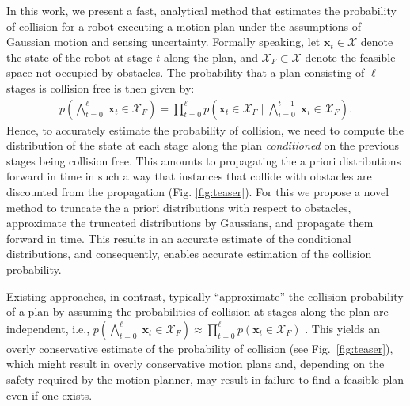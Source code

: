 In this work, we present a fast, analytical method that estimates the probability of collision for a robot executing a motion plan under the assumptions of Gaussian motion and sensing uncertainty. %
Formally speaking, let $\mathbf{x}_t \in \mathcal{X}$ denote the state of the robot at stage $t$ along the plan, and $\mathcal{X}_{F} \subset \mathcal{X}$ denote the feasible space not occupied by obstacles. The probability that a plan consisting of $\ell$ stages is collision free is then given by:
\begin{align}
p(\bigwedge_{t = 0}^{\ell}\; \mathbf{x}_t \in \mathcal{X}_{F}) = \prod_{t = 0}^\ell p(\mathbf{x}_{t} \in \mathcal{X}_{F}\; |\; \bigwedge_{i = 0}^{t-1} \; \mathbf{x}_i \in \mathcal{X}_{F}). \nonumber
\end{align}
Hence, to accurately estimate the probability of collision, we need to compute the distribution of the state at each stage along the plan \emph{conditioned} on the previous stages being collision free. This amounts to propagating the a priori distributions forward in time in such a way that instances that collide with obstacles are discounted from the propagation (Fig. \ref{fig:teaser}). For this we propose a novel method to truncate the a priori distributions with respect to obstacles, approximate the truncated distributions by Gaussians, and propagate them forward in time. This results in an accurate estimate of the conditional distributions, and consequently, enables accurate estimation of the collision probability.

Existing approaches, in contrast, typically ``approximate'' the collision probability of a plan by assuming the probabilities of collision at stages along the plan are independent, i.e., $p(\bigwedge_{t = 0}^{\ell} \; \mathbf{x}_t \in \mathcal{X}_{F}) \approx \prod_{t = 0}^\ell p(\mathbf{x}_{t} \in \mathcal{X}_{F})$ \cite{vandenBerg11_IJRR, Vitus11_ICRA, Bry11_ICRA}. This yields an overly conservative estimate of the probability of collision (see Fig.\ \ref{fig:teaser}), which might result in overly conservative motion plans and, depending on the safety required by the motion planner, may result in failure to find a feasible plan even if one exists.



